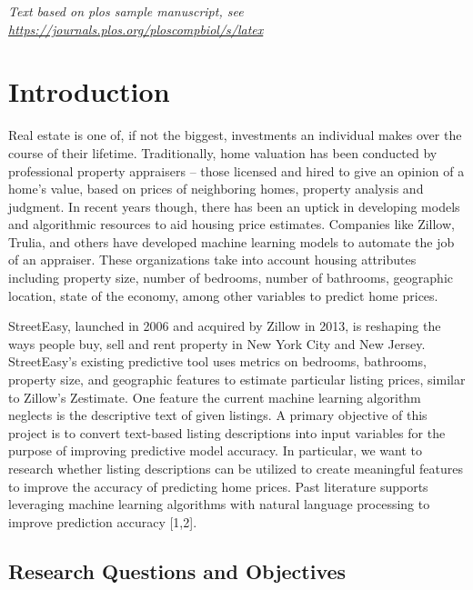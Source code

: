 \documentclass[10pt,letterpaper]{article}
\begin{document}
\linenumbers

\emph{Text based on plos sample manuscript, see
\url{https://journals.plos.org/ploscompbiol/s/latex}}

\hypertarget{introduction}{%
\section{Introduction}\label{introduction}}

Real estate is one of, if not the biggest, investments an individual
makes over the course of their lifetime. Traditionally, home valuation
has been conducted by professional property appraisers -- those licensed
and hired to give an opinion of a home's value, based on prices of
neighboring homes, property analysis and judgment. In recent years
though, there has been an uptick in developing models and algorithmic
resources to aid housing price estimates. Companies like Zillow, Trulia,
and others have developed machine learning models to automate the job of
an appraiser. These organizations take into account housing attributes
including property size, number of bedrooms, number of bathrooms,
geographic location, state of the economy, among other variables to
predict home prices.

StreetEasy, launched in 2006 and acquired by Zillow in 2013, is
reshaping the ways people buy, sell and rent property in New York City
and New Jersey. StreetEasy's existing predictive tool uses metrics on
bedrooms, bathrooms, property size, and geographic features to estimate
particular listing prices, similar to Zillow's Zestimate. One feature
the current machine learning algorithm neglects is the descriptive text
of given listings. A primary objective of this project is to convert
text-based listing descriptions into input variables for the purpose of
improving predictive model accuracy. In particular, we want to research
whether listing descriptions can be utilized to create meaningful
features to improve the accuracy of predicting home prices. Past
literature supports leveraging machine learning algorithms with natural
language processing to improve prediction accuracy {[}1,2{]}.

\hypertarget{research-questions-and-objectives}{%
\subsection{Research Questions and
Objectives}\label{research-questions-and-objectives}}
\end{document}
